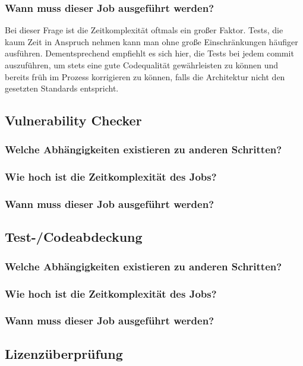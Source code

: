 \subsubsection{Wann muss dieser Job ausgeführt werden?}

Bei dieser Frage ist die Zeitkomplexität oftmals ein großer Faktor.
Tests, die kaum Zeit in Anspruch nehmen kann man ohne große Einschränkungen häufiger ausführen.
Dementsprechend empfiehlt es sich hier, die Tests bei jedem commit auszuführen, um stets eine gute Codequalität gewährleisten zu können und bereits früh im Prozess korrigieren zu können, falls die Architektur nicht den gesetzten Standards entspricht.

\subsection{Vulnerability Checker}
\subsubsection{Welche Abhängigkeiten existieren zu anderen Schritten?}
\subsubsection{Wie hoch ist die Zeitkomplexität des Jobs?}
\subsubsection{Wann muss dieser Job ausgeführt werden?}

\subsection{Test-/Codeabdeckung}
\subsubsection{Welche Abhängigkeiten existieren zu anderen Schritten?}
\subsubsection{Wie hoch ist die Zeitkomplexität des Jobs?}
\subsubsection{Wann muss dieser Job ausgeführt werden?}

\subsection{Lizenzüberprüfung}
